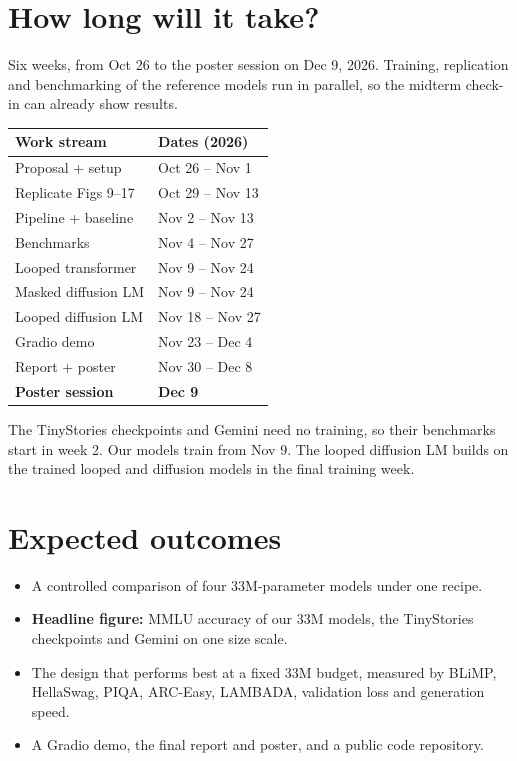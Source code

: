 \documentclass[11pt]{article}
\begin{document}
\section{How long will it take?}

Six weeks, from Oct 26 to the poster session on Dec 9, 2026. Training, replication and benchmarking of the reference models run in parallel, so the midterm check-in can already show results.

\begin{center}
\small
\begin{tabular}{ll}
\toprule
\textbf{Work stream} & \textbf{Dates (2026)} \\
\midrule
Proposal + setup & Oct 26 -- Nov 1 \\
Replicate Figs 9--17 & Oct 29 -- Nov 13 \\
Pipeline + baseline & Nov 2 -- Nov 13 \\
Benchmarks & Nov 4 -- Nov 27 \\
Looped transformer & Nov 9 -- Nov 24 \\
Masked diffusion LM & Nov 9 -- Nov 24 \\
Looped diffusion LM & Nov 18 -- Nov 27 \\
Gradio demo & Nov 23 -- Dec 4 \\
Report + poster & Nov 30 -- Dec 8 \\
\textbf{Poster session} & \textbf{Dec 9} \\
\bottomrule
\end{tabular}
\end{center}

The TinyStories checkpoints and Gemini need no training, so their benchmarks start in week 2. Our models train from Nov 9. The looped diffusion LM builds on the trained looped and diffusion models in the final training week.

\section{Expected outcomes}

\begin{itemize}
  \item A controlled comparison of four 33M-parameter models under one recipe.
  \item \textbf{Headline figure:} MMLU accuracy of our 33M models, the TinyStories checkpoints and Gemini on one size scale.
  \item The design that performs best at a fixed 33M budget, measured by BLiMP, HellaSwag, PIQA, ARC-Easy, LAMBADA, validation loss and generation speed.
  \item A Gradio demo, the final report and poster, and a public code repository.
\end{itemize}
\end{document}
